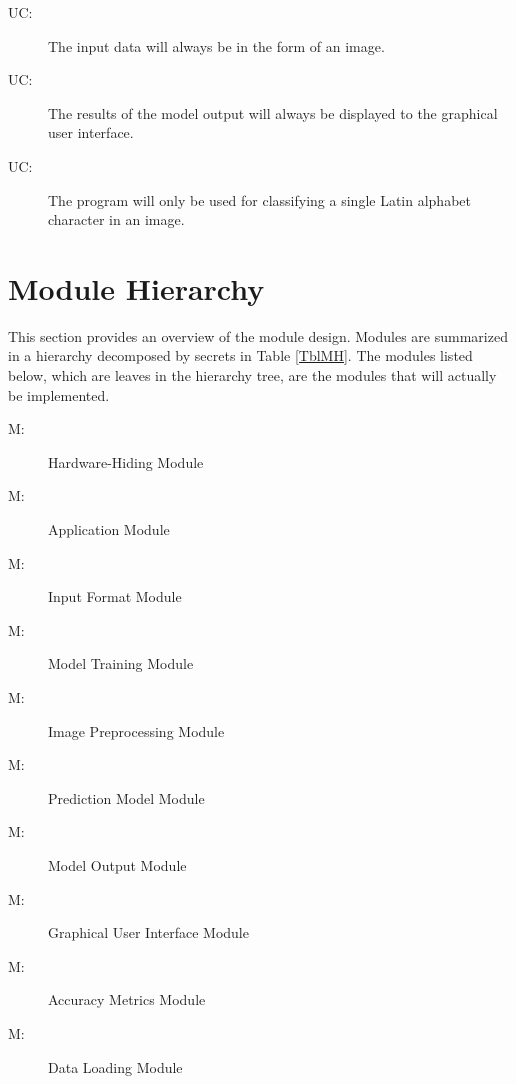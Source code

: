 \documentclass[12pt, titlepage]{article}
\newcounter{ucnum}
\newcommand{\uctheucnum}{UC\theucnum}
\newcounter{mnum}
\newcommand{\mthemnum}{M\themnum}
\begin{document}
\begin{description}
\item[ \uctheucnum \label{ucInput}:] The input data will
always be in the form of an image.
\item[ \uctheucnum \label{ucOutput}:] The results of the
model output will always be displayed to the graphical user interface.
\item[ \uctheucnum \label{ucPurpose}:] The program will
only be used for classifying a single Latin alphabet character in an image.
\end{description}

\section{Module Hierarchy} \label{SecMH}

This section provides an overview of the module design. Modules are summarized
in a hierarchy decomposed by secrets in Table \ref{TblMH}. The modules listed
below, which are leaves in the hierarchy tree, are the modules that will
actually be implemented.

\begin{description}
\item [ \mthemnum \label{mHH}:] Hardware-Hiding Module
\item [ \mthemnum \label{mApplication}:] Application Module
\item [ \mthemnum \label{mInput}:] Input Format Module
\item [ \mthemnum \label{mTraining}:] Model Training Module
\item [ \mthemnum \label{mPreprocessing}:] Image Preprocessing Module
\item [ \mthemnum \label{mModel}:] Prediction Model Module
\item [ \mthemnum \label{mOutput}:] Model Output Module
\item [ \mthemnum \label{mGUI}:] Graphical User Interface Module
\item [ \mthemnum \label{mAccuracy}:] Accuracy Metrics Module
\item [ \mthemnum \label{mData}:] Data Loading Module
\end{description}
\end{document}
